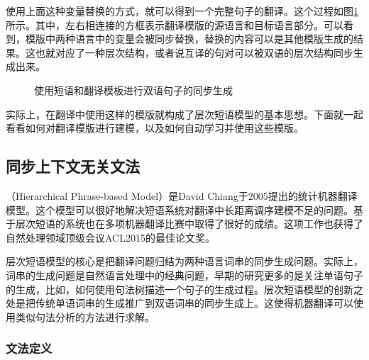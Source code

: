 \parinterval 使用上面这种变量替换的方式，就可以得到一个完整句子的翻译。这个过程如图\ref{fig:4-32}所示。其中，左右相连接的方框表示翻译模版的源语言和目标语言部分。可以看到，模版中两种语言中的变量会被同步替换，替换的内容可以是其他模版生成的结果。这也就对应了一种层次结构，或者说互译的句对可以被双语的层次结构同步生成出来。

\begin{figure}[htp]
\centering

\caption{使用短语和翻译模板进行双语句子的同步生成}
\label{fig:4-32}
\end{figure}

\parinterval 实际上，在翻译中使用这样的模版就构成了层次短语模型的基本思想。下面就一起看看如何对翻译模版进行建模，以及如何自动学习并使用这些模版。


\subsection{同步上下文无关文法}

（Hierarchical Phrase-based Model）是David Chiang于2005提出的统计机器翻译模型\cite{chiang2005a,chiang2007hierarchical}。这个模型可以很好地解决短语系统对翻译中长距离调序建模不足的问题。基于层次短语的系统也在多项机器翻译比赛中取得了很好的成绩。这项工作也获得了自然处理领域顶级会议ACL2015的最佳论文奖。

\parinterval 层次短语模型的核心是把翻译问题归结为两种语言词串的同步生成问题。实际上，词串的生成问题是自然语言处理中的经典问题，早期的研究更多的是关注单语句子的生成，比如，如何使用句法树描述一个句子的生成过程。层次短语模型的创新之处是把传统单语词串的生成推广到双语词串的同步生成上。这使得机器翻译可以使用类似句法分析的方法进行求解。


\subsubsection{文法定义}

